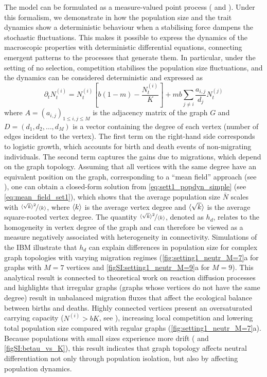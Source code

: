   The model can be formulated as a measure-valued point process (\cite{Bansaye2015} and ). Under this formalism, we demonstrate in  how the population size and the trait dynamics show a deterministic behaviour when a stabilising force dampens the stochastic fluctuations. This makes it possible to express the dynamics of the macroscopic properties with deterministic differential equations, connecting emergent patterns to the processes that generate them. In particular, under the setting of no selection, competition stabilises the population size fluctuations, and the dynamics can be considered deterministic and expressed as
  \begin{equation}\label{eq:sett1_popdyn_simple}
	\partial_t N_t^{(i)} = N_t^{(i)} \left[ b(1-m) - \frac{N_t^{(i)}}{K} \right] + m b \sum_{j\neq i}\frac{a_{i,j}}{d_j} N_t^{(j)}
  \end{equation}
  where $A = (a_{i,j})_{1\leq i, j \leq M}$ is the adjacency matrix of the graph $G$ and $D = (d_1,d_2,\dots,d_M)$ is a vector containing the degree of each vertex (number of edges incident to the vertex). %
  The first term on the right-hand side corresponds to logistic growth, which accounts for birth and death events of non-migrating individuals. The second term captures the gains due to migrations, which depend on the graph topology. 
  Assuming that all vertices with the same degree have an equivalent position on the graph, corresponding to a “mean field” approach (see ), one can obtain a closed-form solution from \cref{eq:sett1_popdyn_simple} (see \cref{eq:mean_field_set1}), which shows that the average population size $\bar{N}$ scales with $\nicefrac{\langle \sqrt{k} \rangle^2}{\langle k \rangle}$, where $\langle k \rangle$ is the average vertex degree and $\langle \sqrt{k} \rangle$ is the average square-rooted vertex degree. 
  The quantity $\nicefrac{\langle \sqrt{k} \rangle^2}{\langle k \rangle}$, denoted as $h_d$, relates to the homogeneity in vertex degree of the graph and can therefore be viewed as a measure negatively associated with heterogeneity in connectivity. Simulations of the IBM illustrate that $h_d$ can explain differences in population size for complex graph topologies with varying migration regimes (\cref{fig:setting1_neutr_M=7}a for graphs with $M=7$ vertices and \cref{figSI:setting1_neutr_M=9}a for $M=9$). 
  This analytical result is connected to theoretical work on reaction diffusion processes \cite{Colizza2007} and highlights that irregular graphs (graphs whose vertices do not have the same degree) result in unbalanced migration fluxes that affect the ecological balance between births and deaths. Highly connected vertices present an oversaturated carrying capacity ($N^{(i)} > bK$, see ), increasing local competition and lowering total population size compared with regular graphs (\cref{fig:setting1_neutr_M=7}a).
  Because populations with small sizes experience more drift (\cite{Burger2000} and \cref{figSI:betau_vs_K}), this result indicates that graph topology affects neutral differentiation not only through population isolation, but also by affecting population dynamics.
  

